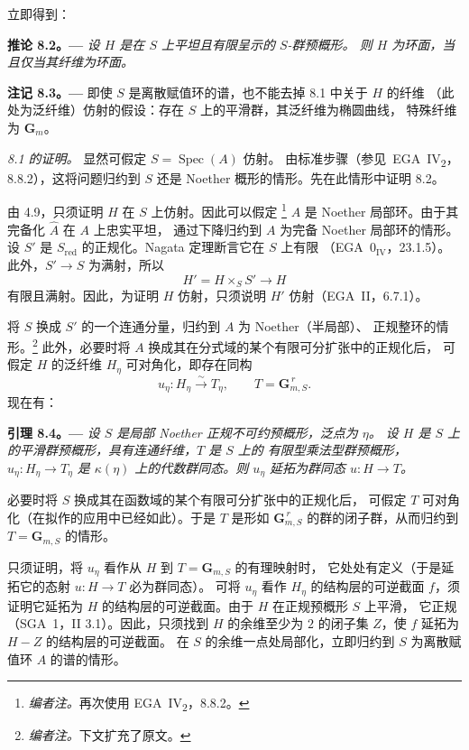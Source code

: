 立即得到：

\par\medskip\noindent{}\textbf{推论 8.2。---}\enspace
\emph{设 \(H\) 是在 \(S\) 上平坦且有限呈示的 \(S\)-群预概形。
则 \(H\) 为环面，当且仅当其纤维为环面。}

\par\medskip\noindent{}\textbf{注记 8.3。---}\enspace
即使 \(S\) 是离散赋值环的谱，也不能去掉 8.1 中关于 \(H\) 的纤维
（此处为泛纤维）仿射的假设：存在 \(S\) 上的平滑群，其泛纤维为椭圆曲线，
特殊纤维为 \(\mathbf{G}_m\)。

\medskip
\noindent\emph{8.1 的证明。}
显然可假定 \(S=\operatorname{Spec}(A)\) 仿射。
由标准步骤（参见\ EGA~IV\textsubscript{2}，8.8.2），这将问题归约到 \(S\) 还是
Noether 概形的情形。先在此情形中证明 8.2。

由 4.9，只须证明 \(H\) 在 \(S\) 上仿射。因此可以假定
\footnote{\textit{编者注。}再次使用 EGA~IV\textsubscript{2}，8.8.2。}
\(A\) 是 Noether 局部环。由于其完备化 \(\widehat A\) 在 \(A\) 上忠实平坦，
通过下降归约到 \(A\) 为完备 Noether 局部环的情形。
设 \(S'\) 是 \(S_{\mathrm{red}}\) 的正规化。Nagata 定理断言它在 \(S\) 上有限
（EGA~\(0_{\mathrm{IV}}\)，23.1.5）。此外，\(S'\to S\) 为满射，所以
\[
  H'=H\times_S S'\longrightarrow H
\]
有限且满射。因此，为证明 \(H\) 仿射，只须说明 \(H'\) 仿射（EGA~II，6.7.1）。

将 \(S\) 换成 \(S'\) 的一个连通分量，归约到 \(A\) 为 Noether（半局部）、
正规整环的情形。\footnote{\textit{编者注。}下文扩充了原文。}
此外，必要时将 \(A\) 换成其在分式域的某个有限可分扩张中的正规化后，
可假定 \(H\) 的泛纤维 \(H_\eta\) 可对角化，即存在同构
\[
  u_\eta:H_\eta\xrightarrow{\sim}T_\eta,
  \qquad T=\mathbf{G}_{m,S}^{\,r}.
\]
现在有：

\par\medskip\noindent{}\textbf{引理 8.4。---}\enspace
\emph{设 \(S\) 是局部 Noether 正规不可约预概形，泛点为 \(\eta\)。
设 \(H\) 是 \(S\) 上的平滑群预概形，具有连通纤维，\(T\) 是 \(S\) 上的
有限型乘法型群预概形，\(u_\eta:H_\eta\to T_\eta\) 是 \(\kappa(\eta)\)
上的代数群同态。则 \(u_\eta\) 延拓为群同态 \(u:H\to T\)。}

必要时将 \(S\) 换成其在函数域的某个有限可分扩张中的正规化后，
可假定 \(T\) 可对角化（在拟作的应用中已经如此）。于是 \(T\) 是形如
\(\mathbf{G}_{m,S}^{\,r}\) 的群的闭子群，从而归约到 \(T=\mathbf{G}_{m,S}\) 的情形。

只须证明，将 \(u_\eta\) 看作从 \(H\) 到 \(T=\mathbf{G}_{m,S}\) 的有理映射时，
它处处有定义（于是延拓它的态射 \(u:H\to T\) 必为群同态）。
可将 \(u_\eta\) 看作 \(H_\eta\) 的结构层的可逆截面 \(f\)，须证明它延拓为
\(H\) 的结构层的可逆截面。由于 \(H\) 在正规预概形 \(S\) 上平滑，
它正规（SGA~1，II 3.1）。因此，只须找到 \(H\) 的余维至少为 \(2\) 的闭子集
\(Z\)，使 \(f\) 延拓为 \(H-Z\) 的结构层的可逆截面。
在 \(S\) 的余维一点处局部化，立即归约到 \(S\) 为离散赋值环 \(A\) 的谱的情形。

